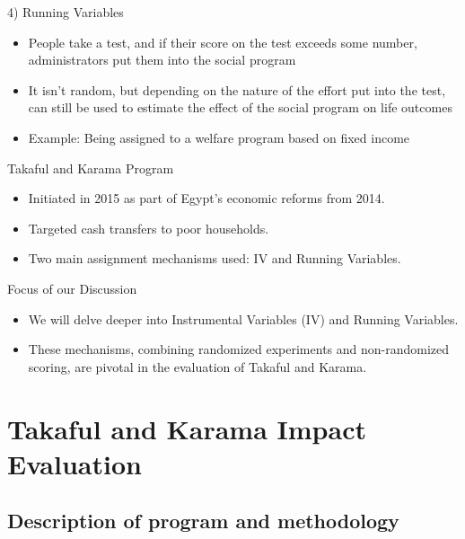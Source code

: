 \documentclass{beamer}
\begin{document}
\begin{frame}{4) Running Variables}
\begin{itemize}
\item People take a test, and if their score on the test exceeds some number, administrators put them into the social program
\item It isn't random, but depending on the nature of the effort put into the test, can still be used to estimate the effect of the social program on life outcomes
\item Example: Being assigned to a welfare program based on fixed income
\end{itemize}
\end{frame}

\begin{frame}{Takaful and Karama Program}
\begin{itemize}
\item Initiated in 2015 as part of Egypt's economic reforms from 2014.
\item Targeted cash transfers to poor households.
\item Two main assignment mechanisms used: IV and Running Variables.
\end{itemize}
\end{frame}

\begin{frame}{Focus of our Discussion}
\begin{itemize}
\item We will delve deeper into Instrumental Variables (IV) and Running Variables.
\item These mechanisms, combining randomized experiments and non-randomized scoring, are pivotal in the evaluation of Takaful and Karama.
\end{itemize}
\end{frame}



\section{Takaful and Karama Impact Evaluation}

\subsection{Description of program and methodology}
\end{document}
